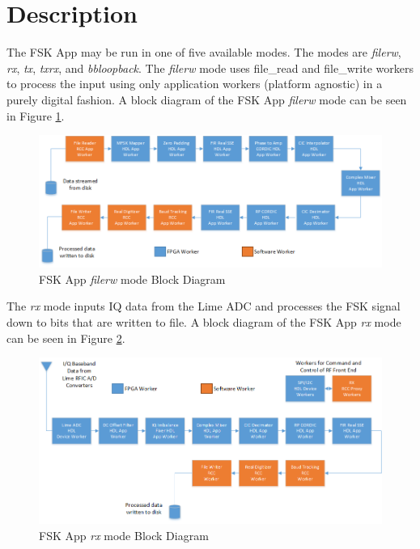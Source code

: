 \section{Description}
The FSK App may be run in one of five available modes. The modes are \textit{filerw}, \textit{rx}, \textit{tx}, \textit{txrx}, and \textit{bbloopback}. The \textit{filerw} mode uses file\_read and file\_write workers to process the input using only application workers (platform agnostic) in a purely digital fashion. A block diagram of the FSK App \textit{filerw} mode can be seen in Figure \ref{fig:filerw_mode_block_diagram}.\par\medskip
	\begin{figure}[ht]
	 	\centering
		\includegraphics[scale=.65]{filerw_mode_block_diagram}
		\caption{FSK App \textit{filerw} mode Block Diagram}
		\label{fig:filerw_mode_block_diagram}
	\end{figure}
\newpage
\noindent The \textit{rx} mode inputs IQ data from the Lime ADC and processes the FSK signal down to bits that are written to file. A block diagram of the FSK App \textit{rx} mode can be seen in Figure \ref{fig:rx_mode_block_diagram}.\par\medskip
	\begin{figure}[ht]
	 	\centering
		\includegraphics[scale=.65]{rx_mode_block_diagram}
		\caption{FSK App \textit{rx} mode Block Diagram}
		\label{fig:rx_mode_block_diagram}
	\end{figure}

